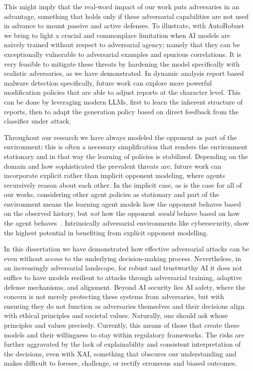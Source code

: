 This might imply that the real-word impact of our work puts adversaries in an advantage, something that holds only if these adversarial capabilities are not used in advance to mount passive and active defenses.
To illustrate, with AutoRobust we bring to light a crucial and commonplace limitation when AI models are naively trained without respect to adversarial agency; namely that they can be exceptionally vulnerable to adversarial examples and spurious correlations.
It is very feasible to mitigate these threats by hardening the model specifically with realistic adversaries, as we have demonstrated.
In dynamic analysis report based malware detection specifically, future work can explore more powerful modification policies that are able to adjust reports at the character level.
This can be done by leveraging modern LLMs, first to learn the inherent structure of reports, then to adapt the generation policy based on direct feedback from the classifier under attack.

Throughout our research we have always modeled the opponent as part of the environment; this is often a necessary simplification that renders the environment stationary and in that way the learning of policies is stabilized.
Depending on the domain and how sophisticated the prevalent threats are, future work can incorporate explicit rather than implicit opponent modeling, where agents recursively reason about each other.
In the implicit case, as is the case for all of our works, considering other agent policies as stationary and part of the environment means the learning agent models how the opponent behaves based on the observed history, but \emph{not} how the opponent \emph{would} behave based on how the agent behaves~\cite{albrecht2018autonomous, wen2019probabilistic}.
Intrinsically adversarial environments like cybersecurity, show the highest potential in benefiting from explicit opponent modelling.

In this dissertation we have demonstrated how effective adversarial attacks can be even without access to the underlying decision-making process.
Nevertheless, in an increasingly adversarial landscape, for robust and trustworthy \gls{AI} it does not suffice to have models resilient to attacks through adversarial training, adaptive defense mechanisms, and alignment.
Beyond AI security lies AI safety, where the concern is not merely protecting these systems from adversaries, but with ensuring they do not function as adversaries themselves and their decisions align with ethical principles and societal values.
Naturally, one should ask whose principles and values precisely.
Currently, this means of those that create these models and their willingness to stay within regulatory frameworks.
The risks are further aggravated by the lack of explainability and consistent interpretation of the decisions, even with \gls{XAI}, something that obscures our understanding and makes difficult to foresee, challenge, or rectify erroneous and biased outcomes.

